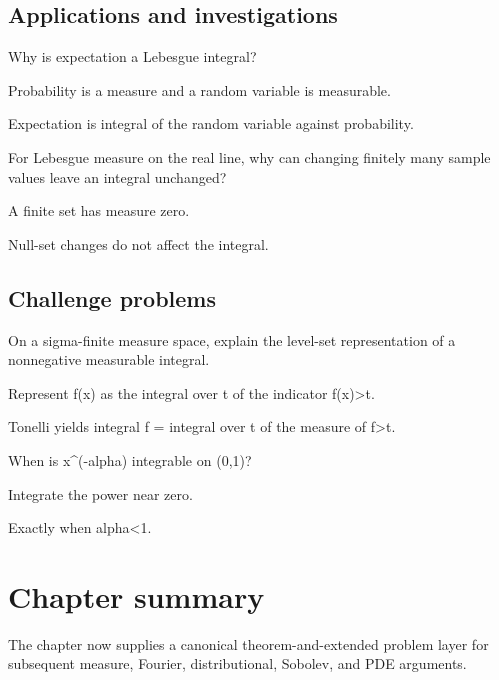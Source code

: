 \subsection*{Applications and investigations}

\begin{exercise}[Expectation]\label{exr:iii03-expand-13}
Why is expectation a Lebesgue integral?
\end{exercise}
\begin{hint}
Probability is a measure and a random variable is measurable.
\end{hint}
\begin{solution}
Expectation is integral of the random variable against probability.
\end{solution}

\begin{exercise}\label{exr:iii03-expand-14}
For Lebesgue measure on the real line, why can changing finitely many sample values leave an integral unchanged?
\end{exercise}
\begin{hint}
A finite set has measure zero.
\end{hint}
\begin{solution}
Null-set changes do not affect the integral.
\end{solution}

\subsection*{Challenge problems}

\begin{exercise}\label{exr:iii03-expand-15}
On a sigma-finite measure space, explain the level-set representation of a nonnegative measurable integral.
\end{exercise}
\begin{hint}
Represent f(x) as the integral over t of the indicator f(x)>t.
\end{hint}
\begin{solution}
Tonelli yields integral f = integral over t of the measure of {f>t}.
\end{solution}

\begin{exercise}\label{exr:iii03-expand-16}
When is x\textasciicircum{}(-alpha) integrable on (0,1)?
\end{exercise}
\begin{hint}
Integrate the power near zero.
\end{hint}
\begin{solution}
Exactly when alpha<1.
\end{solution}
\section*{Chapter summary}
The chapter now supplies a canonical theorem-and-extended problem layer for subsequent measure, Fourier, distributional, Sobolev, and PDE arguments.
